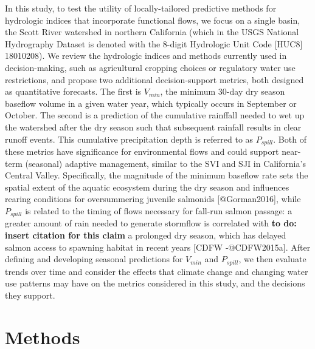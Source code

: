 \documentclass[
]{article}
\begin{document}
In this study, to test the utility of locally-tailored predictive
methods for hydrologic indices that incorporate functional flows, we
focus on a single basin, the Scott River watershed in northern
California (which in the USGS National Hydrography Dataset is denoted
with the 8-digit Hydrologic Unit Code {[}HUC8{]} 18010208). We review
the hydrologic indices and methods currently used in decision-making,
such as agricultural cropping choices or regulatory water use
restrictions, and propose two additional decision-support metrics, both
designed as quantitative forecasts. The first is \(V_{min}\), the
minimum 30-day dry season baseflow volume in a given water year, which
typically occurs in September or October. The second is a prediction of
the cumulative rainffall needed to wet up the watershed after the dry
season such that subsequent rainfall results in clear runoff events.
This cumulative precipitation depth is referred to as \(P_{spill}\).
Both of these metrics have significance for environmental flows and
could support near-term (seasonal) adaptive management, similar to the
SVI and SJI in California's Central Valley. Specifically, the magnitude
of the minimum baseflow rate sets the spatial extent of the aquatic
ecosystem during the dry season and influences rearing conditions for
oversummering juvenile salmonids {[}@Gorman2016{]}, while \(P_{spill}\)
is related to the timing of flows necessary for fall-run salmon passage:
a greater amount of rain needed to generate stormflow is correlated with
\textbf{to do: insert citation for this claim} a prolonged dry season,
which has delayed salmon access to spawning habitat in recent years
{[}CDFW -@CDFW2015a{]}. After defining and developing seasonal
predictions for \(V_{min}\) and \(P_{spill}\), we then evaluate trends
over time and consider the effects that climate change and changing
water use patterns may have on the metrics considered in this study, and
the decisions they support.

\hypertarget{methods}{%
\section{Methods}\label{methods}}
\end{document}
